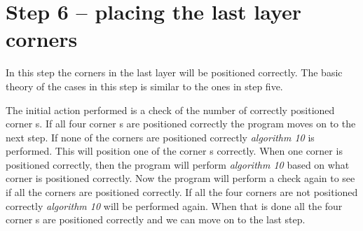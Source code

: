 \section{Step 6 -- placing the last layer corners}
In this step the corners in the last layer will be positioned correctly. 
The basic theory of the cases in this step is similar to the ones in step five.

The initial action performed is a check of the number of correctly positioned corner \cpiece{}s. 
If all four corner \cpiece{}s are positioned correctly the program moves on to the next step.
If none of the corners are positioned correctly \textit{algorithm 10} is performed. This will position one of the corner \cpiece{}s correctly.
When one corner is positioned correctly, then the program will perform \textit{algorithm 10} based on what corner is positioned correctly.
Now the program will perform a check again to see if all the corners are positioned correctly. If all the four corners are not positioned correctly \textit{algorithm 10} will be performed again.
When that is done all the four corner \cpiece{}s are positioned correctly and we can move on to the last step.